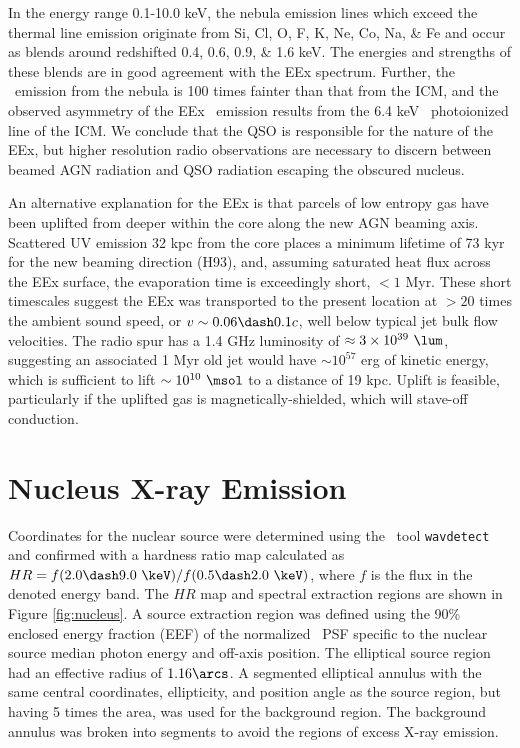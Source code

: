 \documentclass[useAMS,usenatbib]{mn2e}
\begin{document}
In the energy range 0.1-10.0 keV, the nebula emission lines which
exceed the thermal line emission originate from Si, Cl, O, F, K, Ne,
Co, Na, \& Fe and occur as blends around redshifted 0.4, 0.6, 0.9, \&
1.6 keV. The energies and strengths of these blends are in good
agreement with the EEx spectrum. Further, the \feka\ emission from the
nebula is 100 times fainter than that from the ICM, and the observed
asymmetry of the EEx \feka\ emission results from the 6.4 keV
\feka\ photoionized line of the ICM. We conclude that the QSO is
responsible for the nature of the EEx, but higher resolution radio
observations are necessary to discern between beamed AGN radiation and
QSO radiation escaping the obscured nucleus.

An alternative explanation for the EEx is that parcels of low entropy
gas have been uplifted from deeper within the core along the new AGN
beaming axis. Scattered UV emission 32 kpc from the core places a
minimum lifetime of 73 kyr for the new beaming direction (H93), and,
assuming saturated heat flux across the EEx surface, the evaporation
time is exceedingly short, $< 1$ Myr. These short timescales suggest
the EEx was transported to the present location at $> 20$ times the
ambient sound speed, or $v \sim 0.06 \dash 0.1c$, well below typical
jet bulk flow velocities. The radio spur has a 1.4 GHz luminosity of
$\approx 3 \times 10^{39} ~\lum$, suggesting an associated 1 Myr old
jet would have $\sim 10^{57}$ erg of kinetic energy, which is
sufficient to lift $\sim 10^{10} ~\msol$ to a distance of 19
kpc. Uplift is feasible, particularly if the uplifted gas is
magnetically-shielded, which will stave-off conduction.

\section{Nucleus X-ray Emission}
\label{sec:centsrc}

Coordinates for the nuclear source were determined using the
\ciao\ tool {\tt wavdetect} and confirmed with a hardness ratio map
calculated as $HR = f(2.0 \dash 9.0 ~\keV) / f(0.5 \dash 2.0 ~\keV)$,
where $f$ is the flux in the denoted energy band. The $HR$ map and
spectral extraction regions are shown in Figure \ref{fig:nucleus}. A
source extraction region was defined using the 90\% enclosed energy
fraction (EEF) of the normalized \chandra\ PSF specific to the nuclear
source median photon energy and off-axis position. The elliptical
source region had an effective radius of $1.16\arcs$. A segmented
elliptical annulus with the same central coordinates, ellipticity, and
position angle as the source region, but having 5 times the area, was
used for the background region. The background annulus was broken into
segments to avoid the regions of excess X-ray emission.
\end{document}
